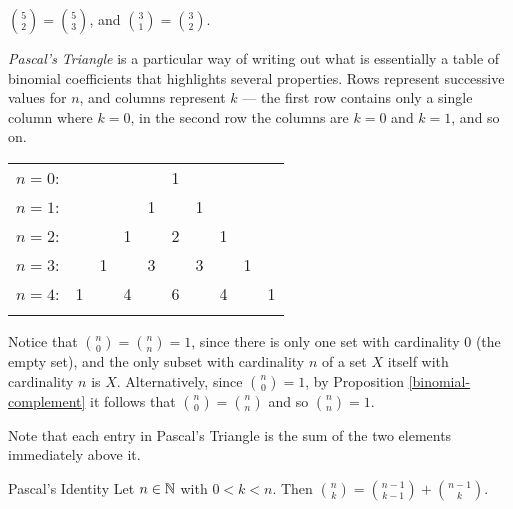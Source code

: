 \begin{exmp}
    $\binom{5}{2} = \binom{5}{3}$, and $\binom{3}{1} = \binom{3}{2}$.
\end{exmp}

\begin{defn}\label{pascals-triangle}
    \emph{Pascal's Triangle} is a particular way of writing out what is essentially a table of binomial coefficients that highlights several properties. Rows represent successive values for $n$, and columns represent $k$ --- the first row contains only a single column where $k=0$, in the second row the columns are $k=0$ and $k=1$, and so on.
    \begin{center}
        \begin{tabular}{rccccccccc}
            $n=0$:&    &    &    &    &  1\\\noalign{\smallskip\smallskip}
            $n=1$:&    &    &    &  1 &    &  1\\\noalign{\smallskip\smallskip}
            $n=2$:&    &    &  1 &    &  2 &    &  1\\\noalign{\smallskip\smallskip}
            $n=3$:&    &  1 &    &  3 &    &  3 &    &  1\\\noalign{\smallskip\smallskip}
            $n=4$:&  1 &    &  4 &    &  6 &    &  4 &    &  1\\\noalign{\smallskip\smallskip}
        \end{tabular}
    \end{center}
\end{defn}

\begin{rmk}
    Notice that $\binom{n}{0} = \binom{n}{n} = 1$, since there is only one set with cardinality $0$ (the empty set), and the only subset with cardinality $n$ of a set $X$ itself with cardinality $n$ is $X$. Alternatively, since $\binom{n}{0} = 1$, by Proposition \ref{binomial-complement} it follows that $\binom{n}{0} = \binom{n}{n}$ and so $\binom{n}{n} = 1$.
\end{rmk}

\begin{rmk}
    Note that each entry in Pascal's Triangle is the sum of the two elements immediately above it.
\end{rmk}

\begin{prop}{Pascal's Identity}\label{pascals-identity}
    Let $n \in \mathbb{N}$ with $0 < k < n$. Then $\binom{n}{k} = \binom{n-1}{k-1} + \binom{n-1}{k}$.
\end{prop}

